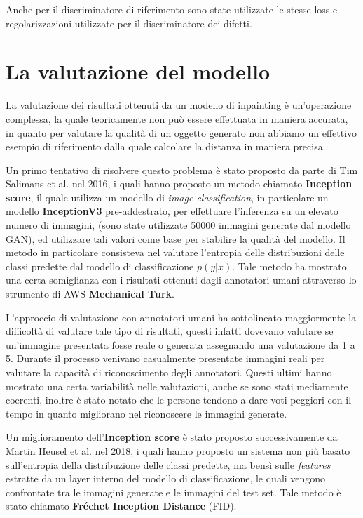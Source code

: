 Anche per il discriminatore di riferimento sono state utilizzate le stesse loss e regolarizzazioni utilizzate per il discriminatore dei difetti.

\section{La valutazione del modello}
La valutazione dei risultati ottenuti da un modello di inpainting è un'operazione complessa, la quale teoricamente non può essere
effettuata in maniera accurata, in quanto per valutare la qualità di un oggetto generato non abbiamo un effettivo esempio di riferimento dalla
quale calcolare la distanza in maniera precisa.

Un primo tentativo di risolvere questo problema è stato proposto da parte di Tim Salimans et al. \cite{salimans2016improved}  nel 2016, 
i quali hanno proposto un metodo chiamato \textbf{Inception score}, il quale utilizza
un modello di \textit{image classification}, in particolare un modello \textbf{InceptionV3} pre-addestrato, per effettuare l'inferenza su un elevato numero di immagini,
(sono state utilizzate 50000 immagini generate dal modello GAN), ed utilizzare tali valori come base per stabilire la qualità del modello.
Il metodo in particolare consisteva nel valutare l'entropia delle distribuzioni delle classi predette dal modello di classificazione $p(y|x)$.
Tale metodo ha mostrato una certa somiglianza con i risultati ottenuti dagli annotatori umani attraverso lo strumento di AWS
\textbf{Mechanical Turk}. 

L'approccio di valutazione con annotatori umani ha sottolineato maggiormente la difficoltà di valutare tale tipo
di risultati, questi infatti dovevano valutare se un'immagine presentata fosse reale o generata assegnando una valutazione da 1 a 5.
Durante il processo venivano casualmente presentate immagini reali per valutare la capacità di riconoscimento degli annotatori. 
Questi ultimi hanno mostrato una certa variabilità nelle valutazioni, anche se sono stati mediamente coerenti,
inoltre è stato notato che le persone tendono a dare voti peggiori con il tempo in quanto migliorano nel riconoscere le immagini generate.

Un miglioramento dell'\textbf{Inception score} è stato proposto successivamente da Martin Heusel et al. \cite{heusel2018gans} nel 2018,
i quali hanno proposto un sistema non più basato sull'entropia della distribuzione delle classi predette,
ma bensì sulle \textit{features} estratte da un layer interno del modello di classificazione, le quali vengono confrontate tra le immagini generate e le immagini del test set.
Tale metodo è stato chiamato \textbf{Fréchet Inception Distance} (FID).

